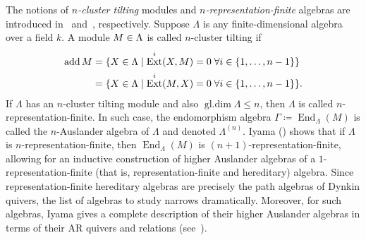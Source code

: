 \documentclass[a4paper,oneside,svgnames]{amsart}
\theoremstyle{plain}
\theoremstyle{definition}
\let\mod\relax
\DeclareMathOperator{\ext}{Ext}
\DeclareMathOperator{\add}{add}
\DeclareMathOperator{\End}{End}
\DeclareMathOperator{\mod}{mod}
\DeclareMathOperator{\gldim}{gl.dim}
\begin{document}
 The notions of \emph{$n$-cluster tilting} modules and
 \emph{$n$-representation-finite} algebras are introduced in~\cite{iya}
 and~\cite{io}, respectively. Suppose $\Lambda$ is any finite-dimensional
 algebra over a field $k$. A module $M \in \mod \Lambda$ is called $n$-cluster
 tilting if
 \begin{align*}
  \add M &= \{X \in \mod \Lambda \mid \ext^{i}(X,M) = 0 \; \forall i \in
  \{1,\ldots,n-1\}\}\\
         &= \{X \in \mod\Lambda \mid \ext^{i}(M,X) = 0 \; \forall i \in
         \{1,\ldots,n-1\}\}.
 \end{align*}
 If $\Lambda$ has an $n$-cluster tilting module and also $\gldim\Lambda \leq n$,
 then $\Lambda$ is called $n$-representation-finite. In such case, the
 endomorphism algebra $\Gamma \coloneqq \End_{\Lambda}(M)$ is called the
 $n$-Auslander algebra of $\Lambda$ and denoted $\Lambda^{(n)}$. Iyama
 (\cite{iya}) shows that if $\Lambda$ is $n$-representation-finite, then
 $\End_{\Lambda}(M)$ is $(n+1)$-representation-finite, allowing for an inductive
 construction of higher Auslander algebras of a $1$-representation-finite (that
 is, representation-finite and hereditary) algebra. Since representation-finite
 hereditary algebras are precisely the path algebras of Dynkin quivers, the list
 of algebras to study narrows dramatically. Moreover, for such algebras, Iyama
 gives a complete description of their higher Auslander algebras in terms of
 their AR quivers and relations (see~\cite[Section~6]{iya}).
\end{document}
